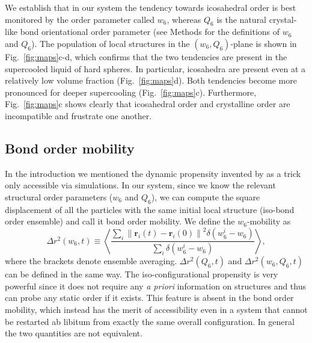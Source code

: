 We establish that in our system the tendency towards icosahedral order is best monitored by the order parameter called $w_6$, whereas $Q_6$ is the natural crystal-like bond 
orientational order parameter (see Methods for the definitions of $w_6$ and $Q_6$). The population of local structures in the $(w_6,Q_6)$-plane is shown in Fig.~\ref{fig:maps}c-d, which confirms that the two tendencies are present in the supercooled liquid of hard spheres. In particular, icosahedra are present even at a relatively low volume fraction (Fig.~\ref{fig:maps}d). Both tendencies become more pronounced for deeper supercooling (Fig.~\ref{fig:maps}c). Furthermore, Fig.~\ref{fig:maps}c shows clearly that icosahedral order and crystalline order are incompatible and frustrate one another.


\subsection*{Bond order mobility}
In the introduction we mentioned the dynamic propensity invented by \citet{Widmer-Cooper2005} as a trick only accessible via simulations. In our system, since we know the relevant structural order parameters ($w_6$ and $Q_6$), we can compute the square displacement of all the particles with the same initial local structure (iso-bond order ensemble) and call it bond order mobility. We define the $w_6$-mobility as
\begin{equation}
	\Delta r^2(w_6, t) \equiv \left\langle \frac{
		\sum\limits_i{
			\left\|\mathbf{r}_i(t)-\mathbf{r}_i(0)\right\|^2 \delta(w_6^i-w_6)
			}
	}{
		\sum\limits_i{\delta(w_6^i-w_6)}
	}\right\rangle, 
	\label{eq:bo_propensity}
\end{equation}
where the brackets denote ensemble averaging. $\Delta r^2(Q_6, t)$ and $\Delta r^2(w_6, Q_6, t)$ can be defined in the same way. 
The iso-configurational propensity is very powerful since it does not require any {\it a priori} information on structures and thus can probe any static order if it exists. This feature is absent in the bond order mobility, which instead has the merit of accessibility even in a system that cannot be restarted ab libitum from exactly the same overall configuration. In general the two quantities are not equivalent.

